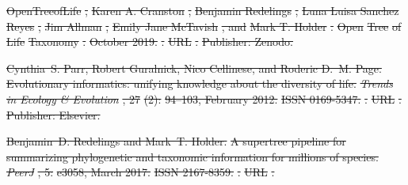 \documentclass[oupdraft]{sysbio_sse}
\providecommand{\DIFdel}[1]{{\protect\color{red}\sout{#1}}}                      %
\begin{document}
\DIFdel{OpenTreeofLife}%
\DIFdel{, }%
\DIFdel{Karen A. Cranston}%
\DIFdel{, }%
\DIFdel{Benjamin Redelings}%
\DIFdel{, }%
\DIFdel{Luna Luisa
  Sanchez Reyes}%
\DIFdel{, }%
\DIFdel{Jim Allman}%
\DIFdel{, }%
\DIFdel{Emily Jane McTavish}%
\DIFdel{, and }%
\DIFdel{Mark T. Holder}%
\DIFdel{.
}%
\DIFdel{Open }%
\DIFdel{Tree}%
\DIFdel{of }%
\DIFdel{Life}%
\DIFdel{Taxonomy}%
\DIFdel{.
}%
\DIFdel{October 2019.
}%
\DIFdel{.
}%
\DIFdel{URL }%
\DIFdel{.
}%
\DIFdel{Publisher: Zenodo.
}%

\DIFdel{Cynthia~S. Parr, Robert Guralnick, Nico Cellinese, and Roderic D.~M. Page.
}%
\DIFdel{Evolutionary informatics: unifying knowledge about the diversity of
  life.
}%
\emph{\DIFdel{Trends in Ecology \& Evolution}}%
\DIFdel{, 27}%
\DIFdel{(2):}%
\DIFdel{94--103, February 2012.
}%
\DIFdel{ISSN 0169-5347.
}%
\DIFdel{.
}%
\DIFdel{URL
  }%
\DIFdel{.
}%
\DIFdel{Publisher: Elsevier.
}%

\DIFdel{Benjamin~D. Redelings and Mark~T. Holder.
}%
\DIFdel{A supertree pipeline for summarizing phylogenetic and taxonomic
  information for millions of species.
}%
\emph{\DIFdel{PeerJ}}%
\DIFdel{, 5:}%
\DIFdel{e3058, March 2017.
}%
\DIFdel{ISSN 2167-8359.
}%
\DIFdel{.
}%
\DIFdel{URL }%
\DIFdel{.
}%
\end{document}
